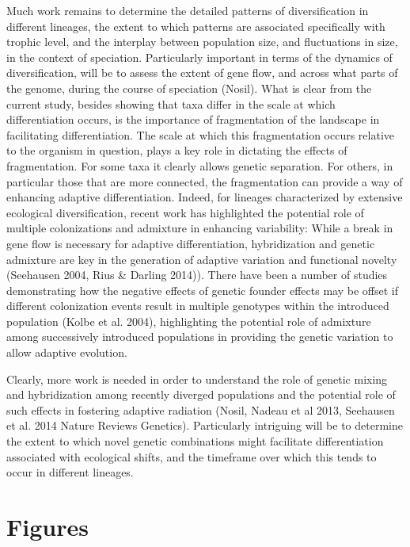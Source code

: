\documentclass[12pt]{article}
\begin{document}
Much work remains to determine the detailed patterns of
diversification in different lineages, the extent to which patterns
are associated specifically with trophic level, and the interplay
between population size, and fluctuations in size, in the context of
speciation. Particularly important in terms of the dynamics of
diversification, will be to assess the extent of gene flow, and across
what parts of the genome, during the course of speciation
(Nosil). What is clear from the current study, besides showing that
taxa differ in the scale at which differentiation occurs, is the
importance of fragmentation of the landscape in facilitating
differentiation. The scale at which this fragmentation occurs relative
to the organism in question, plays a key role in dictating the effects
of fragmentation. For some taxa it clearly allows genetic
separation. For others, in particular those that are more connected,
the fragmentation can provide a way of enhancing adaptive
differentiation. Indeed, for lineages characterized by extensive
ecological diversification, recent work has highlighted the potential
role of multiple colonizations and admixture in enhancing variability:
While a break in gene flow is necessary for adaptive differentiation,
hybridization and genetic admixture are key in the generation of
adaptive variation and functional novelty (Seehausen 2004, Rius \&
Darling 2014)). There have been a number of studies demonstrating how
the negative effects of genetic founder effects may be offset if
different colonization events result in multiple genotypes within the
introduced population (Kolbe et al. 2004), highlighting the potential
role of admixture among successively introduced populations in
providing the genetic variation to allow adaptive evolution.
 
Clearly, more work is needed in order to understand the role of
genetic mixing and hybridization among recently diverged populations
and the potential role of such effects in fostering adaptive radiation
(Nosil, Nadeau et al 2013, Seehausen et al. 2014 Nature Reviews
Genetics). Particularly intriguing will be to determine the extent to
which novel genetic combinations might facilitate differentiation
associated with ecological shifts, and the timeframe over which this
tends to occur in different lineages.




\clearpage

\section*{Figures}
\end{document}
